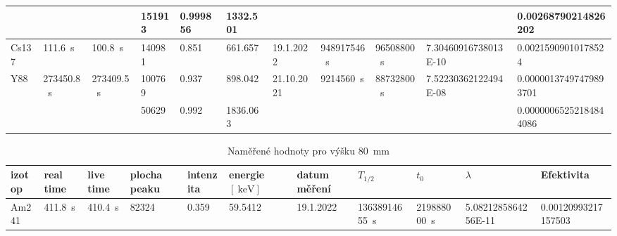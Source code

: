 \documentclass[12pt,a4paper]{article}
\begin{document}
\begin{spacing}{1.5}
\begin{landscape}
\begin{table}
\begin{tabular}{l|l|l|l|l|l|l|l|l|l|l}
		&                          			   							&                          				& \num{151913}       & \num{0.999856}  & \num{1332.501}    					  &                             &                            				&                           			  &                                       		& \num{0.00268790214826202}  \\ \hline
		Cs137                 & \SI{111.6}{\second}                     & \SI{100.8}{\second}                     & \num{140981}       & \num{0.851}     & \num{661.657}      				  & 19.1.2022                   & \SI{948917546}{\second}                  & \SI{96508800}{\second}                  & \num{7.30460916738013E-10}                  & \num{0.00215909010178524}  \\ \hline
		\multirow{2}{*}{Y88}  & \multirow{2}{*}{\SI{273450.8}{\second}} & \multirow{2}{*}{\SI{273409.5}{\second}} & \num{100769}        & \num{0.937}     & \num{898.042}      				  & \multirow{2}{*}{21.10.2021} & \multirow{2}{*}{\SI{9214560}{\second}}   & \multirow{2}{*}{\SI{88732800}{\second}} & \multirow{2}{*}{\num{7.52230362122494E-08}} & \num{0.00000137497479893701} \\ 
		&                          			   							&				                        & \num{50629}        & \num{0.992}     & \num{1836.063}    					  &                             &                            				&                           			  &                                       		& \num{0.00000065252184844086} \\
	\end{tabular}
\end{table}
\end{landscape}
\begin{landscape}
\begin{table}
	\caption{Naměřené hodnoty pro výšku \SI{80}{\milli\meter}}
	\vspace*{2mm}
	\hspace*{-2cm}
	\begin{tabular}{l|l|l|l|l|l|l|l|l|l|l}
	\hline
		izotop                & real time                			   & live time                				& plocha peaku 		 & intenzita	   & energie $ [\SI{}{\kilo\electronvolt}] $& datum měření                & $ T_{1/2}  $                 			    & $t_0$                        			  & $\lambda$                                		& Efektivita                \\ \hline
		Am241                 & \SI{411.8}{\second}                     & \SI{410.4}{\second}                     & \num{82324}        & \num{0.359}     & \num{59.5412}      				  & 19.1.2022                   & \SI{13638914655}{\second}                & \SI{219888000}{\second}                 & \num{5.0821285864256E-11}                   & \num{0.00120993217157503}  \\ \hline

\end{tabular}
\end{table}
\end{landscape}
\end{spacing}
\end{document}
